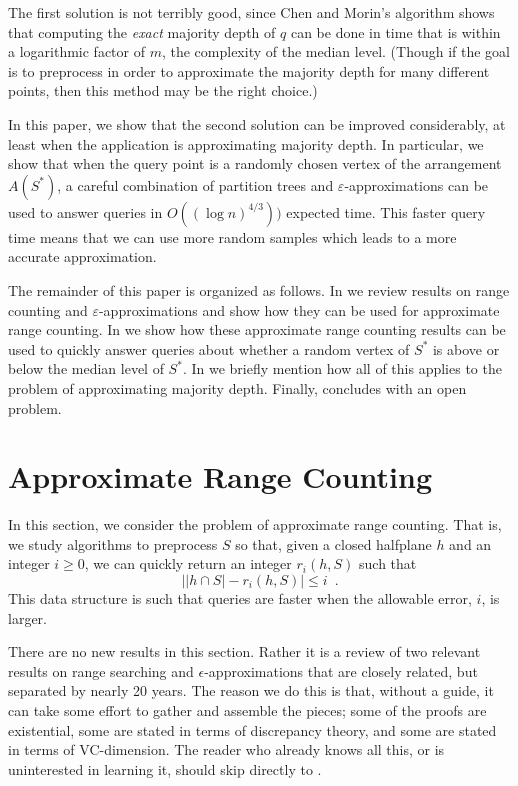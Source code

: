 \documentclass{cccg12}
\newcommand{\eps}{\varepsilon}
\begin{document}
The first solution is not terribly good, since Chen and Morin's algorithm
shows that computing the \emph{exact} majority depth of $q$ can be done
in time that is within a logarithmic factor of $m$, the complexity of
the median level.  (Though if the goal is to preprocess in order to
approximate the majority depth for many different points, then this
method may be the right choice.)

In this paper, we show that the second solution can be improved
considerably, at least when the application is approximating majority
depth.  In particular, we show that when the query point is a randomly
chosen vertex of the arrangement $A(S^*)$, a careful combination of
partition trees \cite{c12} and $\eps$-approximations \cite{mww93}
can be used to answer queries in $O((\log n)^{4/3}))$ expected time.
This faster query time means that we can use more random samples which
leads to a more accurate approximation.

The remainder of this paper is organized as follows.  In
 we review results on range counting and
$\eps$-approximations and show how they can be used for approximate range
counting.  In  we show how these approximate range
counting results can be used to quickly answer queries about whether
a random vertex of $S^*$ is above or below the median level of $S^*$.
In  we briefly mention how all of this applies to
the problem of approximating majority depth.  Finally, 
concludes with an open problem.

\section{Approximate Range Counting}

In this section, we consider the problem of approximate range counting.
That is, we study algorithms to preprocess $S$ so that, given a closed
halfplane $h$ and an integer $i\ge 0$, we can quickly return an integer
$r_i(h,S)$ such that
\[
   \left| |h\cap S| - r_i(h,S)\right| \le i \enspace .
\]
This data structure is such that queries are faster when the allowable
error, $i$, is larger.

There are no new results in this section. Rather it is a review of two
relevant results on range searching and $\epsilon$-approximations that are
closely related, but separated by nearly 20 years.  The reason we do this
is that, without a guide, it can take some effort to gather and assemble
the pieces; some of the proofs are existential, some are stated in terms
of discrepancy theory, and some are stated in terms of VC-dimension.
The reader who already knows all this, or is uninterested in learning it,
should skip directly to .
\end{document}

